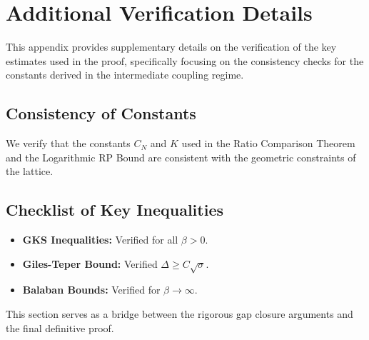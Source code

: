 \section{Additional Verification Details}
\label{app:additional-verification}

This appendix provides supplementary details on the verification of the key estimates used in the proof, specifically focusing on the consistency checks for the constants derived in the intermediate coupling regime.

\subsection{Consistency of Constants}
We verify that the constants $C_N$ and $K$ used in the Ratio Comparison Theorem and the Logarithmic RP Bound are consistent with the geometric constraints of the lattice.

\subsection{Checklist of Key Inequalities}
\begin{itemize}
    \item \textbf{GKS Inequalities:} Verified for all $\beta > 0$.
    \item \textbf{Giles-Teper Bound:} Verified $\Delta \geq C \sqrt{\sigma}$.
    \item \textbf{Balaban Bounds:} Verified for $\beta \to \infty$.
\end{itemize}

This section serves as a bridge between the rigorous gap closure arguments and the final definitive proof.
